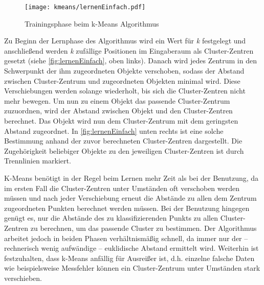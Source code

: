 \begin{figure*}[htbp]
    \centering
   \texttt{[image: kmeans/lernenEinfach.pdf]}
\caption{Trainingsphase beim k-Means Algorithmus}
\label{fig:lernenEinfach}
\end{figure*}

Zu Beginn der Lernphase des Algorithmus wird ein Wert für \emph{k} festgelegt und anschließend werden \emph{k} zufällige Positionen im Eingaberaum als Cluster-Zentren gesetzt (siehe \autoref{fig:lernenEinfach}, oben links). Danach wird jedes Zentrum in den Schwerpunkt der ihm zugeordneten Objekte verschoben, sodass der Abstand zwischen Cluster-Zentrum und zugeordneten Objekten minimal wird. Diese Verschiebungen werden solange wiederholt, bis sich die Cluster-Zentren nicht mehr bewegen. 
Um nun zu einem Objekt das passende Cluster-Zentrum zuzuordnen, wird der Abstand zwischen Objekt und den Cluster-Zentren berechnet. Das Objekt wird nun dem Cluster-Zentrum mit dem geringsten Abstand zugeordnet. In \autoref{fig:lernenEinfach} unten rechts ist  eine solche Bestimmung anhand der zuvor berechneten Cluster-Zentren dargestellt. Die Zugehörigkeit beliebiger Objekte zu den jeweiligen Cluster-Zentren ist durch Trennlinien markiert.


K-Means benötigt in der Regel beim Lernen mehr Zeit als bei der Benutzung, da im ersten Fall die Cluster-Zentren unter Umständen oft verschoben werden müssen und nach jeder Verschiebung erneut die Abstände zu allen dem Zentrum zugeordneten Punkten berechnet werden müssen. Bei der Benutzung hingegen genügt es, nur die Abstände des zu klassifizierenden Punkts zu allen Cluster-Zentren zu berechnen, um das passende Cluster zu bestimmen. Der Algorithmus arbeitet jedoch
in beiden Phasen verhältnismäßig schnell, da immer nur 
der -- rechnerisch wenig aufwändige -- euklidische Abstand ermittelt wird.
Weiterhin ist festzuhalten, dass k-Means anfällig für Ausreißer ist, d.h. einzelne falsche Daten wie beispielsweise Messfehler können ein Cluster-Zentrum unter Umständen stark verschieben.

